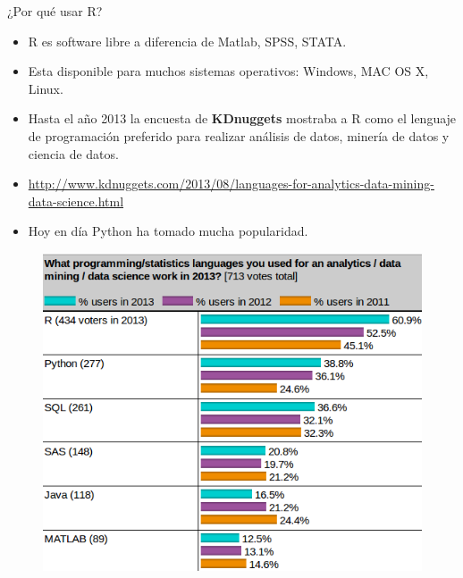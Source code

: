 \documentclass[handout]{beamer}
\begin{document}
\begin{frame}{¿Por qué usar R?}


\scriptsize{
\begin{itemize}
 \item R es software libre a diferencia de Matlab, SPSS, STATA.
 \item Esta disponible para muchos sistemas operativos: Windows, MAC OS X, Linux.
 \item Hasta el año 2013 la encuesta de \textbf{KDnuggets} mostraba a R como el lenguaje de programación preferido para realizar análisis de datos, minería de datos y ciencia de datos.
 \item \url{http://www.kdnuggets.com/2013/08/languages-for-analytics-data-mining-data-science.html}
 \item Hoy en día Python ha tomado mucha popularidad.
\end{itemize}

}

\begin{figure}[h!]
	\centering
	\includegraphics[scale=0.3]{pics/rpoll.png}
\end{figure}


\end{frame}
\end{document}
